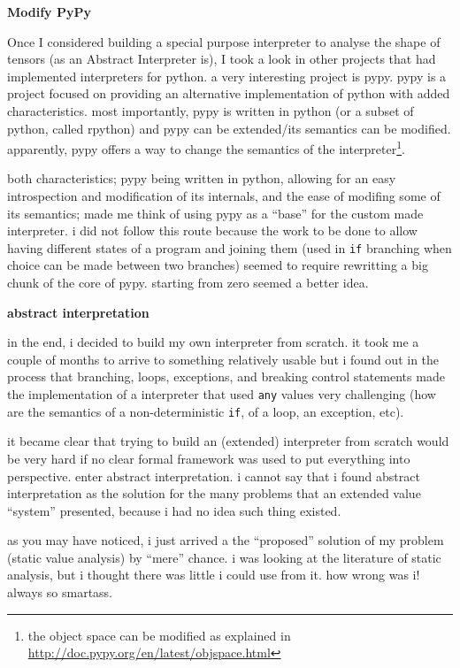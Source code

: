 \documentclass[
11pt, %
english, %
singlespacing, %
headsepline, %
]{MastersDoctoralThesis} %
\newcommand{\nonsection}[1]{\vspace{3mm}\noindent\textbf{\large #1}\vspace{2mm}}
\begin{document}
{\nonsection{Modify PyPy}}

Once I considered building a special purpose interpreter to analyse the
shape of tensors (as an Abstract Interpreter is), I took a look in other
projects that had implemented interpreters for python. a very
interesting project is pypy. pypy \autocite{krekel_pypy_2007} is a
project focused on providing an alternative implementation of python
with added characteristics. most importantly, pypy is written in python
(or a subset of python, called rpython) and pypy can be extended/its
semantics can be modified. apparently, pypy offers a way to change the
semantics of the interpreter\footnote{the object space can be modified
  as explained in \url{http://doc.pypy.org/en/latest/objspace.html}}.

both characteristics; pypy being written in python, allowing for an easy
introspection and modification of its internals, and the ease of
modifing some of its semantics; made me think of using pypy as a
\enquote{base} for the custom made interpreter. i did not follow this
route because the work to be done to allow having different states of a
program and joining them (used in \texttt{if} branching when choice can
be made between two branches) seemed to require rewritting a big chunk
of the core of pypy. starting from zero seemed a better idea.

{\nonsection{abstract interpretation}}

in the end, i decided to build my own interpreter from scratch. it took
me a couple of months to arrive to something relatively usable but i
found out in the process that branching, loops, exceptions, and breaking
control statements made the implementation of a interpreter that used
\texttt{any} values very challenging (how are the semantics of a
non-deterministic \texttt{if}, of a loop, an exception, etc).

it became clear that trying to build an (extended) interpreter from
scratch would be very hard if no clear formal framework was used to put
everything into perspective. enter abstract interpretation. i cannot say
that i found abstract interpretation as the solution for the many
problems that an extended value \enquote{system} presented, because i
had no idea such thing existed.

as you may have noticed, i just arrived a the \enquote{proposed}
solution of my problem (static value analysis) by \enquote{mere} chance.
i was looking at the literature of static analysis, but i thought there
was little i could use from it. how wrong was i! always so
smartass{}.
\end{document}
